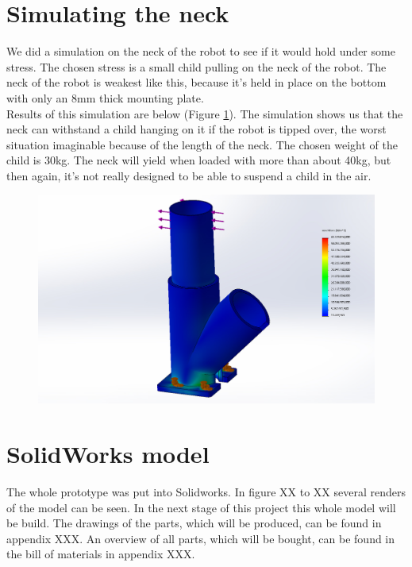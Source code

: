 \documentclass[11pt,twoside,a4paper]{report}
\begin{document}
\section{Simulating the neck}
We did a simulation on the neck of the robot to see if it would hold under some stress. The chosen stress is a small child pulling on the neck of the robot. The neck of the robot is weakest like this, because it’s held in place on the bottom with only an 8mm thick mounting plate.\\
Results of this simulation are below (Figure \ref{fig:simluation}). The simulation shows us that the neck can withstand a child hanging on it if the robot is tipped over, the worst situation imaginable because of the length of the neck. The chosen weight of the child is 30kg. The neck will yield when loaded with more than about 40kg, but then again, it’s not really designed to be able to suspend a child in the air.

\begin{figure}[!htb]
\begin{center}
\includegraphics[width=14cm]{Images/result_simulation.jpg}
\caption{ }
\label{fig:simluation}
\end{center}
\end{figure}
\label{sect:NeckSim}
\section{SolidWorks model}
The whole prototype was put into Solidworks. In figure XX to XX several renders of the model can be seen. In the next stage of this project this whole model will be build. The drawings of the parts, which will be produced, can be found in appendix XXX. An overview of all parts, which will be bought, can be found in the bill of materials in appendix XXX. 
\end{document}
